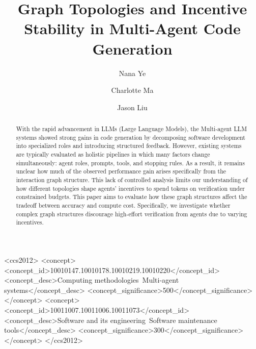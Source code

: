 \documentclass[manuscript,screen,review]{acmart}
\begin{document}
\title{Graph Topologies and Incentive Stability in Multi-Agent Code Generation}

\author{Nana Ye}

\author{Charlotte Ma}
\authornotemark[1]

\author{Jason Liu}
\authornotemark[1]

\renewcommand{\shortauthors}{Ye, Ma, and Liu}

\begin{abstract}
With the rapid advancement in LLMs (Large Language Models), the Multi-agent LLM systems showed strong gains in code generation by decomposing software development into specialized roles and introducing structured feedback. However, existing systems are typically evaluated as holistic pipelines in which many factors change simultaneously: agent roles, prompts, tools, and stopping rules. As a result, it remains unclear how much of the observed performance gain arises specifically from the interaction graph structure. This lack of controlled analysis limits our understanding of how different topologies shape agents’ incentives to spend tokens on verification under constrained budgets. This paper aims to evaluate how these graph structures affect the tradeoff between accuracy and compute cost. Specifically, we investigate whether complex graph structures discourage high-effort verification from agents due to varying incentives.
\end{abstract}

\begin{CCSXML}
<ccs2012>
 <concept>
  <concept_id>10010147.10010178.10010219.10010220</concept_id>
  <concept_desc>Computing methodologies~Multi-agent systems</concept_desc>
  <concept_significance>500</concept_significance>
 </concept>
 <concept>
  <concept_id>10011007.10011006.10011073</concept_id>
  <concept_desc>Software and its engineering~Software maintenance tools</concept_desc>
  <concept_significance>300</concept_significance>
 </concept>
</ccs2012>
\end{CCSXML}

\end{document}
